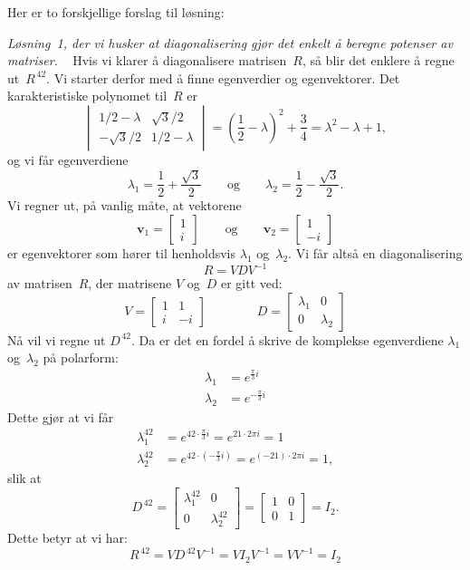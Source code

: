 \documentclass[notitlepage,a4paper,12pt,norsk]{IMFeksamen}
\newcommand{\V}[1]{\mathbf{#1}}
\newcommand{\vv}[2]{\begin{bmatrix} #1 \\ #2 \end{bmatrix}}
\renewcommand{\v}{\V{v}}
\newcommand{\0}{\V{0}}
\newcommand{\oppgslutt}{
\begin{center}
\pgfornament[width=6cm]{88}
\end{center}
}
\newenvironment{losning}{\begin{oppgave}}{\oppgslutt\end{oppgave}}
\begin{document}
\begin{losning}
Her er to forskjellige forslag til løsning:

\emph{Løsning~1,
der vi husker at diagonalisering gjør det enkelt
å beregne potenser av matriser.}
\ %
Hvis vi klarer å diagonalisere matrisen~$R$,
så blir det enklere å regne ut~$R^{\,42}$.
Vi starter derfor med å finne egenverdier og egenvektorer.
Det karakteristiske polynomet til~$R$ er
\[
\begin{vmatrix}
        1/2 - \lambda & \sqrt{3}/2           \\
-\sqrt{3}/2           &        1/2 - \lambda
\end{vmatrix}
= \left( \frac{1}{2} - \lambda \right)^2 + \frac{3}{4}
= \lambda^2 - \lambda + 1,
\]
og vi får egenverdiene
\[
\lambda_1 = \frac{1}{2} + \frac{\sqrt{3}}{2}
\qquad\text{og}\qquad
\lambda_2 = \frac{1}{2} - \frac{\sqrt{3}}{2}.
\]
Vi regner ut, på vanlig måte, at vektorene
\[
\v_1 = \vv{1}{i}
\qquad\text{og}\qquad
\v_2 = \vv{1}{-i}
\]
er egenvektorer som hører til henholdsvis $\lambda_1$ og~$\lambda_2$.
Vi får altså en diagonalisering
\[
R = VDV^{-1}
\]
av matrisen~$R$, der matrisene $V$ og~$D$ er gitt ved:
\[
V =
\begin{bmatrix}
1 &  1 \\
i & -i
\end{bmatrix}
\qquad\qquad
D =
\begin{bmatrix}
\lambda_1 & 0         \\
0         & \lambda_2
\end{bmatrix}
\]
Nå vil vi regne ut $D^{\,42}$.
Da er det en fordel å skrive de komplekse egenverdiene
$\lambda_1$ og~$\lambda_2$ på polarform:
\begin{align*}
\lambda_1 &= e^{\frac{\pi}{3} i} \\
\lambda_2 &= e^{-\frac{\pi}{3} i}
\end{align*}
Dette gjør at vi får
\begin{align*}
\lambda_1^{42} &= e^{42 \cdot \frac{\pi}{3} i} = e^{21 \cdot 2\pi i} = 1 \\
\lambda_2^{42} &= e^{42 \cdot (-\frac{\pi}{3} i)} = e^{(-21) \cdot 2\pi i} = 1,
\end{align*}
slik at
\[
D^{\,42} =
\begin{bmatrix}
\lambda_1^{42} & 0              \\
0              & \lambda_2^{42}
\end{bmatrix}
=
\begin{bmatrix}
1 & 0 \\
0 & 1
\end{bmatrix}
= I_2.
\]
Dette betyr at vi har:
\[
R^{\,42} = V D^{\,42} V^{-1} = V I_2 V^{-1} = V V^{-1} = I_2
\]


\end{losning}
\end{document}
